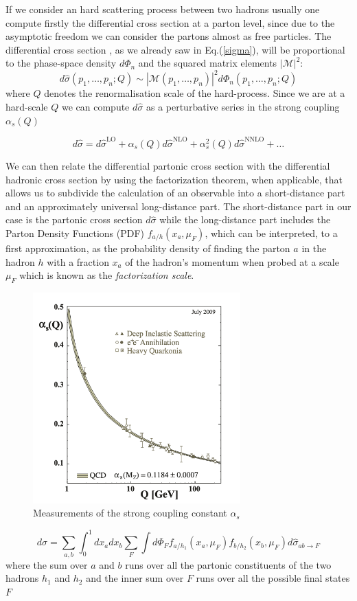 \documentclass[../main/main.tex]{subfiles}
\begin{document}
If we consider an hard scattering  process between two hadrons usually one compute firstly the differential cross section at a parton level, since due to the asymptotic freedom we can consider the partons almost as free particles.
The differential cross section , as we already saw in Eq.(\ref{sigma}), will be proportional to the phase-space density $d\Phi_n$ and the squared
matrix elements $|\mathcal{M}|^2$:
\begin{equation}
	d\hat{\sigma}(p_1,\dots, p_n; Q) \sim |\mathcal{M}(p_1,\dots, p_n)|^2 d\Phi_n(p_1,\dots, p_n; Q) 
\end{equation}
where $Q$ denotes the renormalisation scale of the hard-process. Since we are at a hard-scale $Q$ we can compute $d\hat{\sigma}$ as a 
perturbative series in the strong coupling  $\alpha_s(Q)$

\begin{equation}
	d\hat{\sigma} = d\hat{\sigma}^{\text{LO}} + \alpha_s(Q)  d\hat{\sigma}^{\text{NLO}} + \alpha^2_s(Q)  d\hat{\sigma}^{\text{NNLO}} + \dots
\end{equation}

We can then relate the differential partonic cross section with the differential hadronic cross section by using the factorization theorem, when 
applicable, that allows us to subdivide the calculation of an observable into a short-distance part and an approximately universal long-distance part.
The short-distance part in our case is the partonic cross section $d\hat{\sigma}$  while the long-distance part includes the Parton Density Functions (PDF) $f_{a/h}(x_a,\mu_F)$, which can be interpreted, to a first approximation,  as the probability density of finding the parton $a$ in the hadron $h$ with a 
fraction $x_a$ of the hadron's  momentum when probed at a scale $\mu_F$ which is known as the \emph{factorization scale}.
\begin{figure}[h]
	\centering
	\includegraphics[width=8cm]{../images/asymptotic_freedom.png}
	\caption{Measurements of the strong coupling constant $\alpha_s$}
	\label{alpha}
\end{figure}
\begin{equation}
	\label{QCD fact}
	d\sigma = \sum_{a,b}\int_0^1 dx_a dx_b \sum_F \int d\Phi_F f_{a/h_1}(x_a,\mu_F) f_{b/h_2}(x_b,\mu_F)  d\hat{\sigma}_{ab \rightarrow F}
\end{equation}
where the sum over $a$ and $b$ runs over all the partonic constituents of the two hadrons $h_1$ and $h_2$ and the inner sum over $F$ runs over all the possible final states $F$
\end{document}
